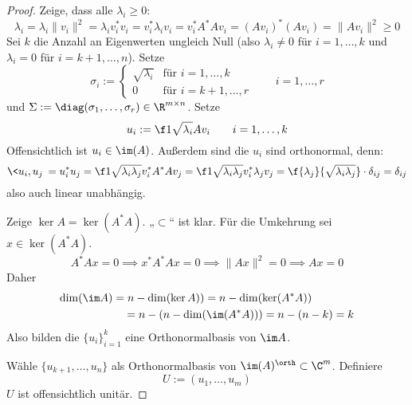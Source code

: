 \documentclass[11pt]{scrbook}
\begin{document}
\begin{st}
\begin{proof}
		Zeige, dass alle $\lambda_i \ge 0$:
		\[
			\lambda_i = \lambda_i \|v_i\|^2 = \lambda_iv_i^*v_i = v_i^* \lambda_i v_i = v_i^* A^*A v_i = (A v_i)^*(A v_i) =  \|Av_i\|^2 \ge 0
		\]
		Sei $k$ die Anzahl an Eigenwerten ungleich Null (also $\lambda_i \neq 0$ für $i=1,\dotsc,k$ und $\lambda_i=0$ für $i=k+1,\dotsc,n$).
		Setze 
		\[
			\sigma_i := \begin{cases}
				\sqrt{\lambda_i} & \text{für $i=1,\dotsc,k$} \\
				0 & \text{für $i=k+1,\dotsc, r$}
			\end{cases}
			\qquad i = 1,\dotsc,r
		\]
		und $\Sigma := \diag(\sigma_1,\dotsc,\sigma_r) \in \R^{m\times n}$.
		Setze 
		\[
			u_i := \f 1{\sqrt{\lambda_i}}Av_i
			\qquad i = 1,\dotsc, k
		\]
		Offensichtlich ist $u_i\in \im(A)$.
		Außerdem sind die $u_i$ sind orthonormal, denn:
		\[
			\<u_i,u_j\> 
			= u_i^*u_j 
			= \f 1{\sqrt{\lambda_i \lambda_j}} v_i^* A^*Av_j
			= \f 1{\sqrt{\lambda_i\lambda_j}}v_i^* \lambda_j v_j
			= \f {\lambda_j} {\sqrt{\lambda_i \lambda_j}}\cdot \delta_{ij} 
			= \delta_{ij}
		\]
		also auch linear unabhängig.

		Zeige $\ker A = \ker (A^*A)$.
		„$\subset$“ ist klar.
		Für die Umkehrung sei $x\in \ker (A^* A)$.
		\[
			A^*A x = 0 \implies x^*A^*Ax = 0 \implies \|Ax\|^2 = 0 \implies Ax=0
		\]
		Daher
		\begin{align*}
			\dim(\im A) 
			&= n - \dim (\ker A)) 
			= n-\dim (\ker(A^*A))  \\
			&\quad = n- (n- \dim(\im(A^*A))) 
			= n-(n-k) = k
		\end{align*}
		Also bilden die $\{u_i\}_{i=1}^k$ eine Orthonormalbasis von $\im A$.

		Wähle $\{u_{k+1},\dotsc, u_n\}$ als Orthonormalbasis von $\im( A)^\orth \subset \C^m$.
		Definiere 
		\[
			U := (u_1,\dotsc, u_m)
		\]
		$U$ ist offensichtlich unitär.


\end{proof}
\end{st}
\end{document}
